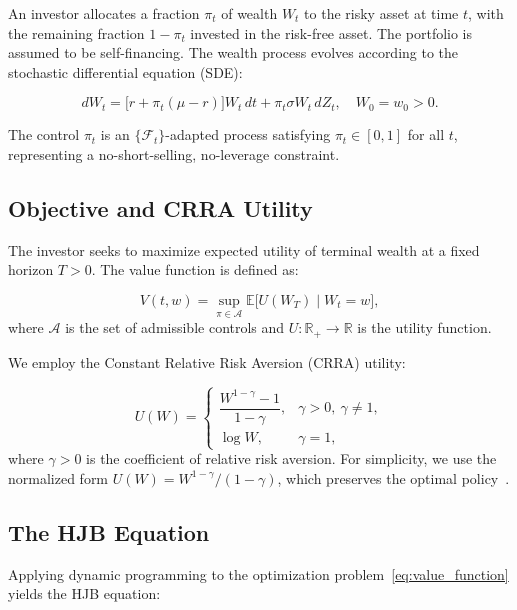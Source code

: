 \documentclass[12pt,a4paper]{article}
\begin{document}
An investor allocates a fraction $\pi_t$ of wealth $W_t$ to the risky asset at time $t$, with the remaining fraction $1 - \pi_t$ invested in the risk-free asset. The portfolio is assumed to be self-financing. The wealth process evolves according to the stochastic differential equation (SDE):

\begin{equation}
\label{eq:wealth_sde}
dW_t = \bigl[r + \pi_t(\mu - r)\bigr] W_t \, dt + \pi_t \sigma W_t \, dZ_t, \quad W_0 = w_0 > 0.
\end{equation}

The control $\pi_t$ is an $\{\mathcal{F}_t\}$-adapted process satisfying $\pi_t \in [0,1]$ for all $t$, representing a no-short-selling, no-leverage constraint.

\subsection{Objective and CRRA Utility}

The investor seeks to maximize expected utility of terminal wealth at a fixed horizon $T > 0$. The value function is defined as:

\begin{equation}
\label{eq:value_function}
V(t, w) = \sup_{\pi \in \mathcal{A}} \mathbb{E}\bigl[ U(W_T) \mid W_t = w \bigr],
\end{equation}
where $\mathcal{A}$ is the set of admissible controls and $U: \mathbb{R}_+ \to \mathbb{R}$ is the utility function.

We employ the Constant Relative Risk Aversion (CRRA) utility:

\begin{equation}
\label{eq:crra_utility}
U(W) = \begin{cases}
\dfrac{W^{1-\gamma} - 1}{1-\gamma}, & \gamma > 0,\ \gamma \neq 1, \\[1.2em]
\log W, & \gamma = 1,
\end{cases}
\end{equation}
where $\gamma > 0$ is the coefficient of relative risk aversion. For simplicity, we use the normalized form $U(W) = W^{1-\gamma}/(1-\gamma)$, which preserves the optimal policy~\cite{merton1969}.

\subsection{The HJB Equation}

Applying dynamic programming to the optimization problem~\eqref{eq:value_function} yields the HJB equation:
\end{document}
